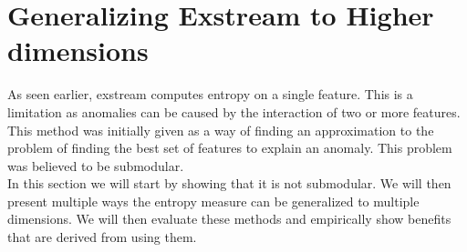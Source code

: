 \documentclass[oneside, a4paper, onecolumn, 11pt]{article}
\begin{document}
\section{Generalizing Exstream to Higher dimensions}
As seen earlier, exstream computes entropy on a single feature. This is a limitation as anomalies can be caused by the interaction of two or more features. This method was initially given as a way of finding an approximation to the problem of finding the best set of features to explain an anomaly. This problem was believed to be submodular.\\
In this section we will start by showing that it is not submodular. We will then present multiple ways the entropy measure can be generalized to multiple dimensions. We will then evaluate these methods and empirically show benefits that are derived from using them.\\
\end{document}
